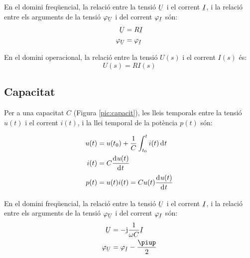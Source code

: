 En el domini freq\"{u}encial, la relaci\'{o} entre
la tensi\'{o} $\cmplx{U}$ i el corrent $\cmplx{I}$, i la relaci\'{o} entre els arguments de
la tensi\'{o} $\varphi_{\cmplx{U}}$ i del corrent $\varphi_{\cmplx{I}}$ s\'{o}n:
\begin{align}
   \cmplx{U} &= R \cmplx{I} \\ \varphi_{\cmplx{U}} &= \varphi_{\cmplx{I}}
\end{align}

 En el domini operacional, la relaci\'{o} entre la tensi\'{o} $U(s)$ i el corrent $I(s)$ \'{e}s:
\begin{equation}
   U(s) = R I(s)
\end{equation}

\subsection{Capacitat} 

Per a una capacitat $C$ (Figura
\vref{pic:capacit}), les lleis temporals entre la tensi\'{o} $u(t)$ i el
corrent $i(t)$, i la llei temporal de la pot\`{e}ncia $p(t)$ s\'{o}n:

\hfill
\begin{minipage}[b]{5cm}
    
    \label{pic:capacit}
\end{minipage}
\hfill
\begin{minipage}[b][3.8cm][t]{8cm}
   \begin{align}
      u(t) &= u(t_0) + \frac{1}{C} \int_{t_0}^t i(t) \diff t \\
      i(t) &= C \deriv{u(t)}{t} \\
      p(t) &= u(t) i(t) = C u(t) \deriv{u(t)}{t}
   \end{align}
\end{minipage}

En el domini freq\"{u}encial, la relaci\'{o} entre la tensi\'{o} $\cmplx{U}$ i el corrent $\cmplx{I}$, i la relaci\'{o} entre els arguments de la tensi\'{o} $\varphi_{\cmplx{U}}$ i del corrent $\varphi_{\cmplx{I}}$ s\'{o}n:
\begin{align}
   \cmplx{U} &= -\ju \frac{1}{\omega C} \cmplx{I} \\
   \varphi_{\cmplx{U}} &= \varphi_{\cmplx{I}} - \frac{\piup}{2}
\end{align}

